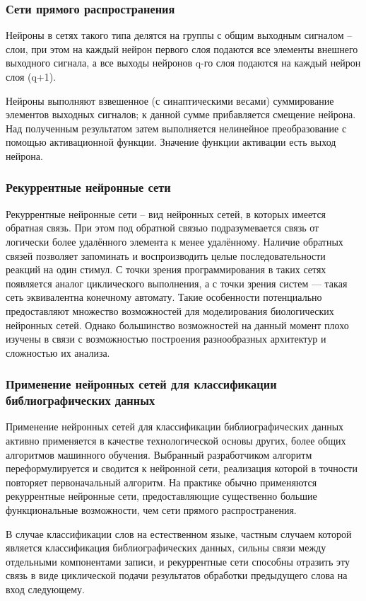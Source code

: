 \subsubsection*{Сети прямого распространения}
Нейроны в сетях такого типа делятся на группы с общим выходным сигналом – слои, при этом на каждый нейрон первого слоя подаются все элементы внешнего выходного сигнала, а все выходы нейронов q-го слоя подаются на каждый нейрон слоя (q+1). 

Нейроны выполняют взвешенное (с синаптическими весами) суммирование элементов выходных сигналов; к данной сумме прибавляется смещение нейрона. Над полученным результатом затем выполняется нелинейное преобразование с помощью активационной функции. Значение функции активации есть выход нейрона.

\subsubsection*{Рекуррентные нейронные сети}
Рекуррентные нейронные сети -- вид нейронных сетей, в которых имеется обратная связь. При этом под обратной связью подразумевается связь от логически более удалённого элемента к менее удалённому. Наличие обратных связей позволяет запоминать и воспроизводить целые последовательности реакций на один стимул. С точки зрения программирования в таких сетях появляется аналог циклического выполнения, а с точки зрения систем — такая сеть эквивалентна конечному автомату. Такие особенности потенциально предоставляют множество возможностей для моделирования биологических нейронных сетей. Однако большинство возможностей на данный момент плохо изучены в связи с возможностью построения разнообразных архитектур и сложностью их анализа.

\subsubsection*{Применение нейронных сетей для классификации библиографических данных}
Применение нейронных сетей для классификации библиографических данных активно применяется в качестве технологической основы других, более общих алгоритмов машинного обучения. Выбранный разработчиком алгоритм переформулируется и сводится к нейронной сети, реализация которой в точности повторяет первоначальный алгоритм. На практике обычно применяются рекуррентные нейронные сети, предоставляющие существенно большие функциональные возможности, чем сети прямого распространения.

В случае классификации слов на естественном языке, частным случаем которой является классификация библиографических данных, сильны связи между отдельными компонентами записи, и рекуррентные сети способны отразить эту связь в виде циклической подачи результатов обработки предыдущего слова на вход следующему.


